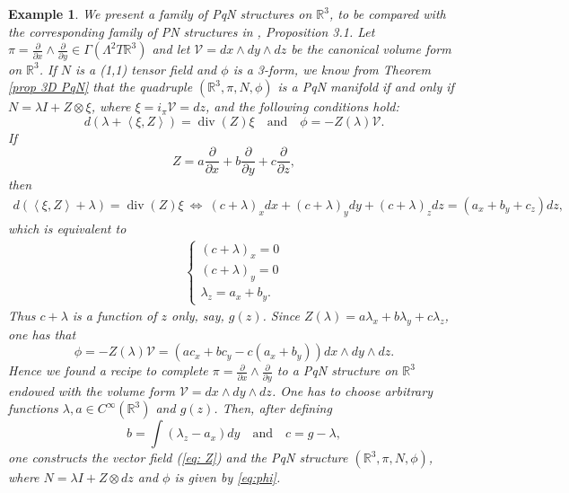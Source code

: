 \documentclass[12pt]{article}
\newtheorem{example}[theorem]{Example}
\begin{document}
\begin{example}\label{exa:PqN-R3} %
We present a family of PqN structures on $\mathbb R^3$, to be compared with the corresponding family of PN 
structures in \cite{Cheng-Sheng}, Proposition 3.1. Let $\pi=\frac{\partial}{\partial x}\wedge\frac{\partial}{\partial y}\in\Gamma(\Lambda^2 T\mathbb R^3)$ 
and let $\mathcal V=dx\wedge dy\wedge dz$ be the canonical volume form on $\mathbb R^3$. 
If $N$ is a (1,1) tensor field and $\phi$ is a 3-form, we know from %
Theorem \ref{prop 3D PqN}
that the quadruple $(\mathbb R^3,\pi,N,\phi)$ is a PqN manifold if and only if 
$N=\lambda I+Z\otimes\xi$, where $\xi=i_{\pi}\mathcal V=dz$, and the following conditions hold:
\begin{equation*}
d\left(\lambda+\left<\xi,Z\right>\right)=\operatorname{div}(Z)\xi\quad\text{and}\quad\phi=-Z(\lambda)\mathcal V.
\end{equation*}
If 
\begin{equation}
\label{eq: Z}
Z=a\frac{\partial}{\partial x}+b\frac{\partial}{\partial y}+c\frac{\partial}{\partial z},
\end{equation}
then 
\begin{align}
d(\left<\xi,Z\right>+\lambda)=
\operatorname{div}(Z)
\xi\ \Longleftrightarrow\ (c+\lambda)_xdx+(c+\lambda)_ydy+(c+\lambda)_zdz
=(a_x+b_y+c_z)dz,\label{eq:equico}
\end{align}
which is equivalent to
\begin{align*}
\begin{cases}
(c+\lambda)_x=0\\
(c+\lambda)_y=0\\
\lambda_z=a_x+b_y.
\end{cases}
\end{align*}
Thus $c+\lambda$ is a function of $z$ only, say, $g(z)$. 
Since $Z(\lambda)=a\lambda_x+b\lambda_y+c\lambda_z$, one has that
\begin{equation}
\phi=-Z(\lambda)\mathcal V=(ac_x+bc_y-c(a_x+b_y))dx\wedge dy\wedge dz.\label{eq:phi}
\end{equation}
Hence we found a recipe to complete $\pi=\frac{\partial}{\partial x}\wedge\frac{\partial}{\partial y}$ 
to a PqN structure on $\mathbb R^3$ endowed with the volume form $\mathcal V=dx\wedge dy\wedge dz$. 
One has to choose arbitrary functions $\lambda,%
a\in C^{\infty}(\mathbb{R}^3)$ and $g(z)$. Then, after defining
\[
b=\int({\lambda}_z-a_x)dy\quad\text{and}\quad c=g-\lambda,
\]
one constructs the vector field (\ref{eq: Z}) and the PqN structure $(\mathbb{R}^3,\pi,N,\phi)$, where $N=\lambda I+Z\otimes dz$ and $\phi$ is given by \eqref{eq:phi}.
\end{example}
\end{document}
